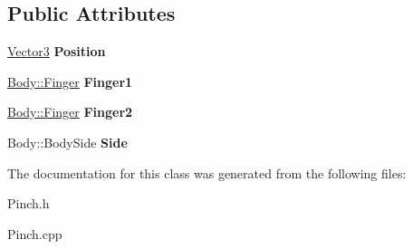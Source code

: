 \subsection*{Public Attributes}
\begin{DoxyCompactItemize}
\item 
\hyperlink{class_efficio_1_1_vector3}{Vector3} {\bfseries Position}\hypertarget{class_efficio_1_1_input_recognition_1_1_human_1_1_hands_1_1_pinch_aef25b5e89e91b9e9a7886a087c1b019f}{}\label{class_efficio_1_1_input_recognition_1_1_human_1_1_hands_1_1_pinch_aef25b5e89e91b9e9a7886a087c1b019f}

\item 
\hyperlink{class_efficio_1_1_body_1_1_finger}{Body\+::\+Finger} {\bfseries Finger1}\hypertarget{class_efficio_1_1_input_recognition_1_1_human_1_1_hands_1_1_pinch_ad8c959f5692cdf6e62381296c9d895fc}{}\label{class_efficio_1_1_input_recognition_1_1_human_1_1_hands_1_1_pinch_ad8c959f5692cdf6e62381296c9d895fc}

\item 
\hyperlink{class_efficio_1_1_body_1_1_finger}{Body\+::\+Finger} {\bfseries Finger2}\hypertarget{class_efficio_1_1_input_recognition_1_1_human_1_1_hands_1_1_pinch_a54b57c5b8ac5818d94a37fe52a5c2633}{}\label{class_efficio_1_1_input_recognition_1_1_human_1_1_hands_1_1_pinch_a54b57c5b8ac5818d94a37fe52a5c2633}

\item 
Body\+::\+Body\+Side {\bfseries Side}\hypertarget{class_efficio_1_1_input_recognition_1_1_human_1_1_hands_1_1_pinch_afacf4440ba63d00e52e205b0710798d1}{}\label{class_efficio_1_1_input_recognition_1_1_human_1_1_hands_1_1_pinch_afacf4440ba63d00e52e205b0710798d1}

\end{DoxyCompactItemize}


The documentation for this class was generated from the following files\+:\begin{DoxyCompactItemize}
\item 
Pinch.\+h\item 
Pinch.\+cpp\end{DoxyCompactItemize}
